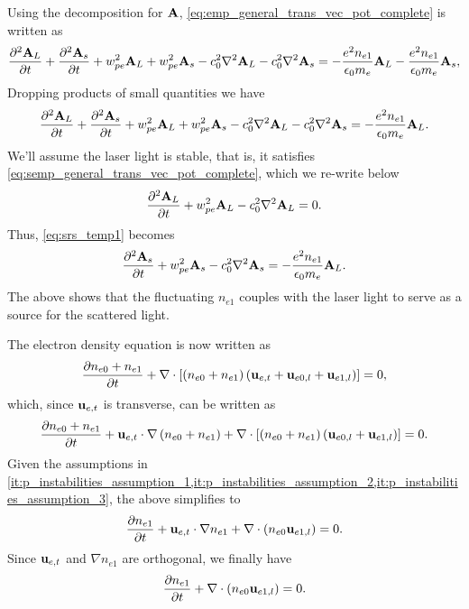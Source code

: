 \documentclass[a4paper,11pt]{report}
\begin{document}
Using the decomposition for $\mathbf{A}$, \cref{eq:emp_general_trans_vec_pot_complete} is written as 
\begin{equation}
    \frac{\partial^2 \mathbf{A}_L}{\partial t} + \frac{\partial^2 \mathbf{A}_s}{\partial t} + w_{pe}^2 \mathbf{A}_L + w_{pe}^2 \mathbf{A}_s - c_0^2 \nabla^2 \mathbf{A}_L - c_0^2 \nabla^2 \mathbf{A}_s = -\frac{e^2 n_{e1}}{\epsilon_0 m_e} \mathbf{A}_L -\frac{e^2 n_{e1}}{\epsilon_0 m_e} \mathbf{A}_s,
\end{equation}
Dropping products of small quantities we have
\begin{equation}
    \label{eq:srs_temp1}
    \frac{\partial^2 \mathbf{A}_L}{\partial t} + \frac{\partial^2 \mathbf{A}_s}{\partial t} + w_{pe}^2 \mathbf{A}_L + w_{pe}^2 \mathbf{A}_s - c_0^2 \nabla^2 \mathbf{A}_L - c_0^2 \nabla^2 \mathbf{A}_s = -\frac{e^2 n_{e1}}{\epsilon_0 m_e} \mathbf{A}_L.
\end{equation}
We'll assume the laser light is stable, that is, it satisfies \cref{eq:semp_general_trans_vec_pot_complete}, which we re-write below
\begin{equation}
    \label{eq:srs_temp2}
    \frac{\partial^2 \mathbf{A}_L}{\partial t} + w_{pe}^2 \mathbf{A}_L - c_0^2 \nabla^2 \mathbf{A}_L = 0.
\end{equation}
Thus, \cref{eq:srs_temp1} becomes
\begin{equation}
    \frac{\partial^2 \mathbf{A}_s}{\partial t} + w_{pe}^2 \mathbf{A}_s - c_0^2 \nabla^2 \mathbf{A}_s = -\frac{e^2 n_{e1}}{\epsilon_0 m_e} \mathbf{A}_L.
\end{equation}
The above shows that the fluctuating $n_{e1}$ couples with the laser light to serve as a source for the scattered light.

The electron density equation is now written as
\begin{equation*}
    \frac{\partial n_{e0} + n_{e1}}{\partial t } + \nabla \cdot \left [ \left ( n_{e0} + n_{e1} \right )\left ( \mathbf{u}_{e,t} + \mathbf{u}_{e0,l} + \mathbf{u}_{e1,l} \right ) \right ] = 0,
\end{equation*}
which, since $\mathbf{u}_{e,t}$ is transverse, can be written as
\begin{equation*}
    \frac{\partial n_{e0} + n_{e1}}{\partial t } + \mathbf{u}_{e,t} \cdot \nabla \left (n_{e0} + n_{e1} \right ) + \nabla \cdot \left [ \left ( n_{e0} + n_{e1} \right )\left ( \mathbf{u}_{e0,l} + \mathbf{u}_{e1,l} \right ) \right ] = 0.
\end{equation*}
Given the assumptions in \cref{it:p_instabilities_assumption_1,it:p_instabilities_assumption_2,it:p_instabilities_assumption_3}, the above simplifies to
\begin{equation*}
    \frac{\partial n_{e1}}{\partial t } + \mathbf{u}_{e,t} \cdot \nabla n_{e1} + \nabla \cdot \left ( n_{e0} \mathbf{u}_{e1,l} \right ) = 0.
\end{equation*}
Since $\mathbf{u}_{e,t}$ and $\nabla n_{e1}$ are orthogonal, we finally have
\begin{equation}
    \label{eq:p_instabilities_e_den_linearized}
    \frac{\partial n_{e1}}{\partial t} + \nabla \cdot \left ( n_{e0} \mathbf{u}_{e1,l} \right ) = 0.
\end{equation}
\end{document}
